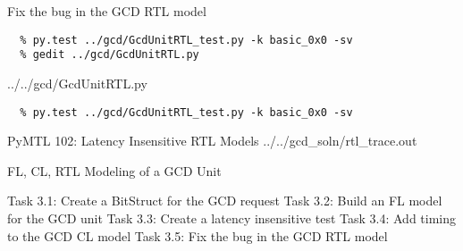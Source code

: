 \begin{task}\begin{frame}[fragile]{Fix the bug in the GCD RTL model}
\vspace{-0.25in}
\begin{Verbatim}[commandchars=\\\{\}]
  % cd    \midtilde/pymtl-tut/build
  % py.test ../gcd/GcdUnitRTL_test.py -k basic_0x0 -sv
  % gedit ../gcd/GcdUnitRTL.py
\end{Verbatim}

\vspace{-0.2in}
%
{../../gcd/GcdUnitRTL.py}

\vspace{-0.3in}
\begin{verbatim}
  % py.test ../gcd/GcdUnitRTL_test.py -k basic_0x0 -sv
\end{verbatim}
\end{frame}
\end{task}

\begin{frame}{PyMTL 102: Latency Insensitive RTL Models}
\vspace{-0.25in}
%
{../../gcd_soln/rtl_trace.out}

\end{frame}


\begin{frame}{ FL, CL, RTL Modeling of a GCD Unit}
\begin{cbxlist}
  \1 Task 3.1: Create a BitStruct for the GCD request
  \1 Task 3.2: Build an FL model for the GCD unit
  \1 Task 3.3: Create a latency insensitive test
  \1 Task 3.4: Add timing to the GCD CL model
  \1 Task 3.5: Fix the bug in the GCD RTL model
  \1 
  \1 
\end{cbxlist}
\end{frame}


